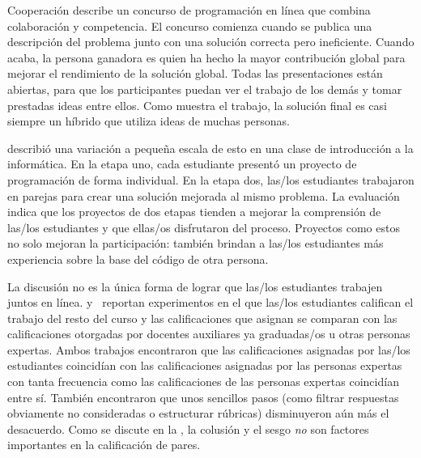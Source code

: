 \begin{aside}{Cooperación}
  \cite{Gull2004} describe un concurso de programación en línea que combina colaboración y competencia.
  El concurso comienza cuando se publica una descripción del problema junto con una solución correcta pero ineficiente.
  Cuando acaba,
  la persona ganadora es quien ha hecho la mayor contribución global
  para mejorar el rendimiento de la solución global.
  Todas las presentaciones están abiertas,
  para que los participantes puedan ver el trabajo de los demás y tomar prestadas ideas entre ellos.
  Como muestra el trabajo,
  la solución final es casi siempre un híbrido que utiliza ideas de muchas personas.

  \cite{Batt2018} describió una variación a pequeña escala de esto en una clase de introducción a la informática.
  En la etapa uno,
  cada estudiante presentó un proyecto de programación de forma individual.
  En la etapa dos,
  las/los estudiantes trabajaron en parejas para crear una solución mejorada al mismo problema.
  La evaluación indica que los proyectos de dos etapas tienden a mejorar la comprensión de las/los estudiantes
  y que ellas/os disfrutaron del proceso.
  Proyectos como estos no solo mejoran la participación:
  también brindan a las/los estudiantes más experiencia sobre la base del código de otra persona.
\end{aside}

La discusión no es la única forma de lograr que las/los estudiantes trabajen juntos en línea.
\cite{Pare2008} y~\cite{Kulk2013} reportan experimentos
en el que las/los estudiantes califican el trabajo del resto del curso
y las calificaciones que asignan se comparan con
las calificaciones otorgadas por docentes auxiliares ya graduadas/os u otras personas expertas.
Ambos trabajos encontraron que las calificaciones asignadas por las/los estudiantes coincidían con las calificaciones asignadas por las personas expertas
con tanta frecuencia como las calificaciones de las personas expertas coincidían entre sí. 
También encontraron que unos sencillos pasos
(como filtrar respuestas obviamente no consideradas o estructurar rúbricas)
disminuyeron aún más el desacuerdo.
Como se discute en la ,
la colusión y el sesgo \emph{no} son factores importantes en la calificación de pares.

